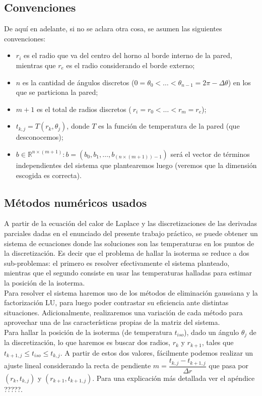 \subsection{Convenciones}
De aquí en adelante, si no se aclara otra cosa, se asumen las siguientes convenciones:
\begin{itemize}
\item$r_i$ es el radio que va del centro del horno al borde interno de la pared, mientras que $r_e$ es el radio considerando el borde externo;
\item$n$ es la cantidad de ángulos discretos ($0=\theta_0 <\hdots< \theta_{n-1} = 2\pi - \Delta \theta$) en los que se particiona la pared;
\item$m+1$ es el total de radios discretos ($~{r_i=r_0<\hdots<r_m=r_e}$); 
\item$t_{k,j} = T(r_k, \theta_j)$, donde $T$ es la función de temperatura de la pared (que desconocemos);
\item$b\in \mathbb{R}^{n\times (m+1)}: b = (b_0, b_1, \hdots, b_{(n\times (m+1))-1})$ será el vector de términos independientes del sistema que plantearemos luego (veremos que la dimensión escogida es correcta). 
\end{itemize}
\subsection{Métodos numéricos usados}
\label{sec:metodos}
A partir de la ecuación del calor de Laplace y las discretizaciones de las derivadas parciales dadas en el enunciado del presente trabajo práctico, se puede obtener un sistema de ecuaciones donde las soluciones son las temperaturas en los puntos de la discretización. 
Es decir que el problema de hallar la isoterma se reduce a dos sub-problemas: el primero es resolver efectivamente el sistema planteado, mientras que el segundo consiste en usar las temperaturas halladas para estimar la posición de la isoterma.\\
Para resolver el sistema haremos uso de los métodos de eliminación gaussiana y la factorización LU, para luego poder contrastar su eficiencia ante distintas situaciones. Adicionalmente, realizaremos una variación de cada método para aprovechar una de las características propias de la matriz del sistema.\\
Para hallar la posición de la isoterma (de temperatura $t_{iso}$), dado un ángulo $\theta_j$ de la discretización, lo que haremos es buscar dos radios, $r_k$ y $r_{k+1}$, tales que $t_{k+1,j} \leq t_{iso} \leq t_{k, j}$. A partir de estos dos valores, fácilmente podemos realizar un ajuste lineal considerando la recta de pendiente $m = \dfrac{t_{k,j}-t_{k+1,j}}{\Delta r}$ que pasa por $(r_k,t_{k,j})$ y $(r_{k+1}, t_{k+1,j})$. Para una explicación más detallada ver el apéndice ?????.

